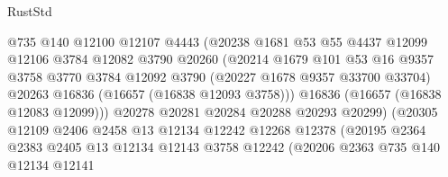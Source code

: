 \begin{lexlean}{RustStd}
\begin{coremodule}
                                @735
                                @140
                                @12100
                                @12107
                                @4443
                                (@20238
                                  @1681
                                  @53
                                  @55
                                  @4437
                                  @12099
                                  @12106
                                  @3784
                                  @12082
                                  @3790
                                  @20260
                                  (@20214
                                    @1679
                                    @101
                                    @53
                                    @16
                                    @9357
                                    @3758
                                    @3770
                                    @3784
                                    @12092
                                    @3790
                                    (@20227 @1678 @9357 @33700 @33704)
                                    @20263
                                    @16836
                                    (@16657 (@16838 @12093 @3758)))
                                  @16836
                                  (@16657 (@16838 @12083 @12099)))
                                @20278
                                @20281
                                @20284
                                @20288
                                @20293
                                @20299)
                              (@20305
                                @12109
                                @2406
                                @2458
                                @13
                                @12134
                                @12242
                                @12268
                                @12378
                                (@20195
                                  @2364
                                  @2383
                                  @2405
                                  @13
                                  @12134
                                  @12143
                                  @3758
                                  @12242
                                  (@20206
                                    @2363
                                    @735
                                    @140
                                    @12134
                                    @12141

\end{coremodule}
\end{lexlean}

